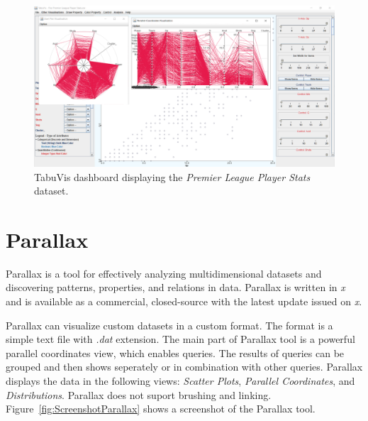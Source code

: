 \begin{figure}[tp]
\centering
\includegraphics[keepaspectratio,width=\linewidth,height=\halfh]
{images/screenshot-tabuvis.png}

\caption[TabuVis Dashboard Screenshot]
{%
TabuVis dashboard displaying the \emph{Premier League Player Stats} dataset.
}
\label{fig:ScreenshotTabuVis}
\end{figure}



\section{Parallax}

Parallax \parencite{inselberg2008parallel} is a tool for effectively analyzing
multidimensional datasets and discovering patterns, properties, and
relations in data. Parallax is written in \emph{x} and is available as
a commercial, closed-source with the latest update issued on \emph{x}.

Parallax can visualize custom datasets in a custom format. The format is a
simple text file with \emph{.dat} extension. The main part of Parallax
tool is a powerful parallel coordinates view, which enables queries. The
results of queries can be grouped and then shows seperately or in
combination with other queries. Parallax displays the data in the
following views: \emph{Scatter Plots}, \emph{Parallel Coordinates}, and
\emph{Distributions}. Parallax does not suport brushing and linking.
Figure~\ref{fig:ScreenshotParallax} shows a screenshot of the Parallax tool.




